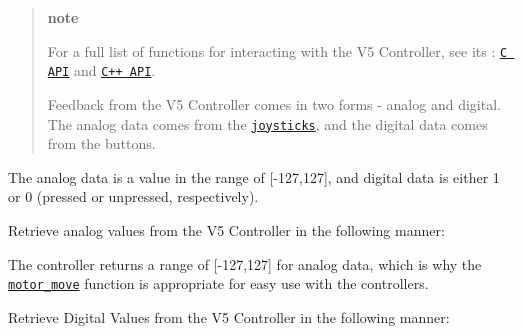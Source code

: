 \begin{quote}
{\bfseries note}

For a full list of functions for interacting with the V5 Controller, see its \+: \href{../../api/c/misc.html}{\tt C A\+PI} and \href{../../api/cpp/misc.html}{\tt C++ A\+PI}.

Feedback from the V5 Controller comes in two forms -\/ analog and digital. The analog data comes from the \href{https://en.wikipedia.org/wiki/Analog_stick}{\tt joysticks}, and the digital data comes from the buttons. \end{quote}


The analog data is a value in the range of \mbox{[}-\/127,127\mbox{]}, and digital data is either 1 or 0 (pressed or unpressed, respectively).

Retrieve analog values from the V5 Controller in the following manner\+:

The controller returns a range of \mbox{[}-\/127,127\mbox{]} for analog data, which is why the \href{../../api/c/motors.html#motor-move}{\tt motor\+\_\+move} function is appropriate for easy use with the controllers.

Retrieve Digital Values from the V5 Controller in the following manner\+: 